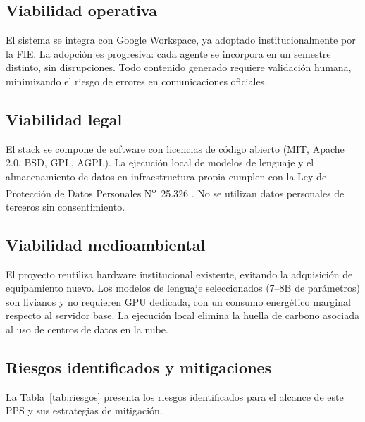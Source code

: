 \documentclass[a4paper, 12pt]{article}
\begin{document}
\subsection{Viabilidad operativa}

El sistema se integra con Google Workspace, ya adoptado institucionalmente por la \ac{FIE}. La adopci\'on es progresiva: cada agente se incorpora en un semestre distinto, sin disrupciones. Todo contenido generado requiere validaci\'on humana, minimizando el riesgo de errores en comunicaciones oficiales.

\subsection{Viabilidad legal}

El stack se compone de software con licencias de c\'odigo abierto (MIT, Apache 2.0, BSD, GPL, AGPL). La ejecuci\'on local de modelos de lenguaje y el almacenamiento de datos en infraestructura propia cumplen con la Ley de Protecci\'on de Datos Personales N\textsuperscript{o}~25.326 \parencite{ley25326}. No se utilizan datos personales de terceros sin consentimiento.

\subsection{Viabilidad medioambiental}

El proyecto reutiliza hardware institucional existente, evitando la adquisici\'on de equipamiento nuevo. Los modelos de lenguaje seleccionados (7--8B de par\'ametros) son livianos y no requieren GPU dedicada, con un consumo energ\'etico marginal respecto al servidor base. La ejecuci\'on local elimina la huella de carbono asociada al uso de centros de datos en la nube.

\subsection{Riesgos identificados y mitigaciones}

La Tabla~\ref{tab:riesgos} presenta los riesgos identificados para el alcance de este PPS y sus estrategias de mitigaci\'on.
\end{document}
